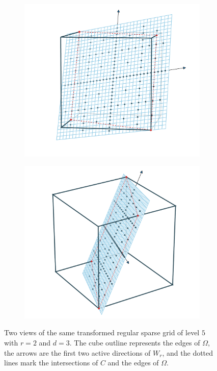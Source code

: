 \documentclass[
  a4paper,  %
  twoside,  %
  bibliography=totoc,
  headsepline,
  cleardoublepage=empty,
  parskip=half,
  draft=false
]{scrbook}
\begin{document}
\newpage
\begin{mdframed}[style=style]
\vspace{2.5mm}
\begin{figure}[H]
\begin{subfigure}{.5\textwidth}
  \centering
  \includegraphics[width=\linewidth]{graphics/surrogate_vis_2}
\end{subfigure}%
\begin{subfigure}{.5\textwidth}
  \centering
  \includegraphics[width=\linewidth]{graphics/surrogate_vis_1}
\end{subfigure}
\vspace{2.5mm}
\delimit
\caption{Two views of the same transformed regular sparse grid of level $5$ with $r=2$ and $d=3$.
The \darkblue cube outline represents the edges of $\Omega$, the arrows are the first two active directions of $W_r$, and the dotted \red lines mark the intersections of $C$ and the edges of $\Omega$.}
\label{fig:trans_vis}
\end{figure}
\end{mdframed}
\end{document}
